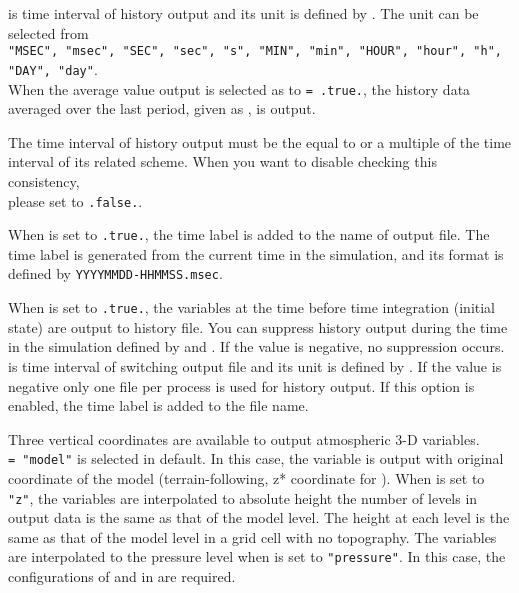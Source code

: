  is time interval of history output and its unit is defined by .
The unit can be selected from\\
\verb|"MSEC", "msec", "SEC", "sec", "s", "MIN", "min", "HOUR", "hour", "h", "DAY", "day"|.\\
%
When the average value output is selected as  to \verb|= .true.|,
the history data averaged over the last period, given as , is output.

The time interval of history output must be the equal to or a multiple of the time interval of its related scheme.
When you want to disable checking this consistency,\\
please set  to \verb|.false.|.

When  is set to \verb|.true.|, the time label is added to the name of output file.
The time label is generated from the current time in the simulation, and its format is defined by \verb|YYYYMMDD-HHMMSS.msec|.

When  is set to \verb|.true.|, the variables at the time before time integration (initial state) are output to history file.
You can suppress history output during the time in the simulation defined by  and .
If the value is negative, no suppression occurs.
 is time interval of switching output file and its unit is defined by .
If the value is negative only one file per process is used for history output. If this option is enabled, the time label is added to the file name.

Three vertical coordinates are available to output atmospheric 3-D variables.\\
 \verb|= "model"| is selected in default.
In this case, the variable is output with original coordinate of the model (terrain-following, z* coordinate for \scalerm).
When  is set to \verb|"z"|, the variables are interpolated to absolute height
the number of levels in output data is the same as that of the model level.
The height at each level is the same as that of the model level in a grid cell with no topography.
The variables are interpolated to the pressure level when  is set to \verb|"pressure"|.
In this case, the configurations of  and  in  are required.

